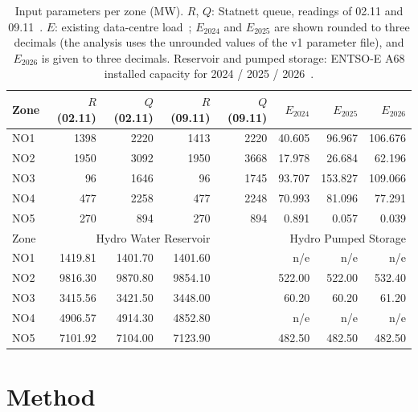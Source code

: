 \begin{table}[t]
\centering
\caption{Input parameters per zone (MW). $R$, $Q$: Statnett queue, readings of 02.11 and 09.11~\cite{pbi}. $E$: existing data-centre load~\cite{elhub,v1}; $E_{2024}$ and $E_{2025}$ are shown rounded to three decimals (the analysis uses the unrounded values of the v1 parameter file), and $E_{2026}$ is given to three decimals. Reservoir and pumped storage: ENTSO-E A68 installed capacity for 2024 / 2025 / 2026~\cite{entsoe}.} %
\label{tab:param}
\small
\begin{tabular}{lrrrrrrr}
\toprule
Zone & $R$ (02.11) & $Q$ (02.11) & $R$ (09.11) & $Q$ (09.11) & $E_{2024}$ & $E_{2025}$ & $E_{2026}$ \\ %
\midrule
NO1 & 1398 & 2220 & 1413 & 2220 & 40.605 & 96.967 & 106.676 \\ %
NO2 & 1950 & 3092 & 1950 & 3668 & 17.978 & 26.684 & 62.196 \\ %
NO3 & 96 & 1646 & 96 & 1745 & 93.707 & 153.827 & 109.066 \\ %
NO4 & 477 & 2258 & 477 & 2248 & 70.993 & 81.096 & 77.291 \\ %
NO5 & 270 & 894 & 270 & 894 & 0.891 & 0.057 & 0.039 \\ %
\midrule
Zone & \multicolumn{3}{r}{Hydro Water Reservoir} & & \multicolumn{3}{r}{Hydro Pumped Storage} \\
\midrule
NO1 & 1419.81 & 1401.70 & 1401.60 & & n/e & n/e & n/e \\ %
NO2 & 9816.30 & 9870.80 & 9854.10 & & 522.00 & 522.00 & 532.40 \\ %
NO3 & 3415.56 & 3421.50 & 3448.00 & & 60.20 & 60.20 & 61.20 \\ %
NO4 & 4906.57 & 4914.30 & 4852.80 & & n/e & n/e & n/e \\ %
NO5 & 7101.92 & 7104.00 & 7123.90 & & 482.50 & 482.50 & 482.50 \\ %
\bottomrule
\end{tabular}
\end{table}

\section{Method}
\label{sec:metode}

